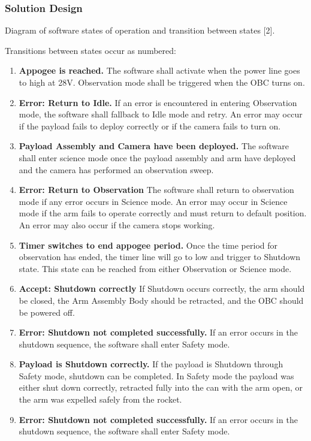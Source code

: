 \documentclass[letterpaper,10pt]{article}
\begin{document}
\subsubsection{Solution Design}

\begin{center}
Diagram of software states of operation and transition between states [2].

Transitions between states occur as numbered:

\begin{enumerate}
\item{\textbf{Appogee is reached.} The software shall activate when the power line goes to high at 28V. Observation mode shall be triggered when the OBC turns on.}
\item{\textbf{Error: Return to Idle.} If an error is encountered in entering Observation mode, the software shall fallback to Idle mode and retry. An error may occur if the payload fails to deploy correctly or if the camera fails to turn on.}
\item{\textbf{Payload Assembly and Camera have been deployed.} The software shall enter science mode once the payload assembly and arm have deployed and the camera has performed an observation sweep.}
\item{\textbf{Error: Return to Observation} The software shall return to observation mode if any error occurs in Science mode. An error may occur in Science mode if the arm fails to operate correctly and must return to default position. An error may also occur if the camera stops working.}
\item{\textbf{Timer switches to end appogee period.} Once the time period for observation has ended, the timer line will go to low and trigger to Shutdown state. This state can be reached from either Observation or Science mode.}
\item{\textbf{Accept: Shutdown correctly} If Shutdown occurs correctly, the arm should be closed, the Arm Assembly Body should be retracted, and the OBC should be powered off.}
\item{\textbf{Error: Shutdown not completed successfully.} If an error occurs in the shutdown sequence, the software shall enter Safety mode.}
\item{\textbf{Payload is Shutdown correctly.} If the payload is Shutdown through Safety mode, shutdown can be completed. In Safety mode the payload was either shut down correctly, retracted fully into the can with the arm open, or the arm was expelled safely from the rocket.}
\item{\textbf{Error: Shutdown not completed successfully.} If an error occurs in the shutdown sequence, the software shall enter Safety mode.}

\end{enumerate}
\end{center}
\end{document}
